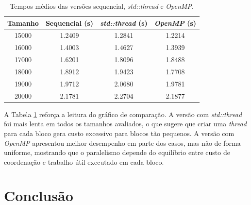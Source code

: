 \begin{table}[H]
    \centering
    \footnotesize
    \begin{tabular}{|c|c|c|c|}
        \hline
        Tamanho & Sequencial (s) & \textit{std::thread} (s) & \textit{OpenMP} (s) \\
        \hline
        15000 & 1.2409 & 1.2841 & 1.2214 \\
        16000 & 1.4003 & 1.4627 & 1.3939 \\
        17000 & 1.6201 & 1.8096 & 1.8488 \\
        18000 & 1.8912 & 1.9423 & 1.7708 \\
        19000 & 1.9712 & 2.0680 & 1.9781 \\
        20000 & 2.1781 & 2.2704 & 2.1877 \\
        \hline
    \end{tabular}
    \caption{Tempos médios das versões sequencial, \textit{std::thread} e \textit{OpenMP}.}
    \label{tab:tempos_medios}
\end{table}

\indent A Tabela \ref{tab:tempos_medios} reforça a leitura do gráfico de comparação. A versão com \textit{std::thread} foi mais lenta em todos os tamanhos avaliados, o que sugere que criar uma \textit{thread} para cada bloco gera custo excessivo para blocos tão pequenos. A versão com \textit{OpenMP} apresentou melhor desempenho em parte dos casos, mas não de forma uniforme, mostrando que o paralelismo depende do equilíbrio entre custo de coordenação e trabalho útil executado em cada bloco.


\section{Conclusão}
